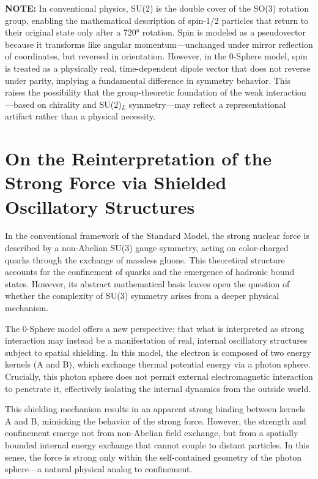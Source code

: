 \documentclass[12pt,letterpaper]{article} %
\begin{document}
\medskip
\noindent\textbf{NOTE:} In conventional physics, SU(2) is the double cover of the SO(3) rotation group, enabling the mathematical description of spin-1/2 particles that return to their original state only after a 720° rotation. Spin is modeled as a pseudovector because it transforms like angular momentum—unchanged under mirror reflection of coordinates, but reversed in orientation. However, in the 0-Sphere model, spin is treated as a physically real, time-dependent dipole vector that does not reverse under parity, implying a fundamental difference in symmetry behavior. This raises the possibility that the group-theoretic foundation of the weak interaction—based on chirality and SU(2)$_L$ symmetry—may reflect a representational artifact rather than a physical necessity.


\section{On the Reinterpretation of the Strong Force via Shielded Oscillatory Structures}

In the conventional framework of the Standard Model, the strong nuclear force is described by a non-Abelian SU(3) gauge symmetry, acting on color-charged quarks through the exchange of massless gluons. This theoretical structure accounts for the confinement of quarks and the emergence of hadronic bound states. However, its abstract mathematical basis leaves open the question of whether the complexity of SU(3) symmetry arises from a deeper physical mechanism.

The 0-Sphere model offers a new perspective: that what is interpreted as strong interaction may instead be a manifestation of real, internal oscillatory structures subject to spatial shielding. In this model, the electron is composed of two energy kernels (A and B), which exchange thermal potential energy via a photon sphere. Crucially, this photon sphere does not permit external electromagnetic interaction to penetrate it, effectively isolating the internal dynamics from the outside world.

This shielding mechanism results in an apparent strong binding between kernels A and B, mimicking the behavior of the strong force. However, the strength and confinement emerge not from non-Abelian field exchange, but from a spatially bounded internal energy exchange that cannot couple to distant particles. In this sense, the force is strong only within the self-contained geometry of the photon sphere—a natural physical analog to confinement.
\end{document}
